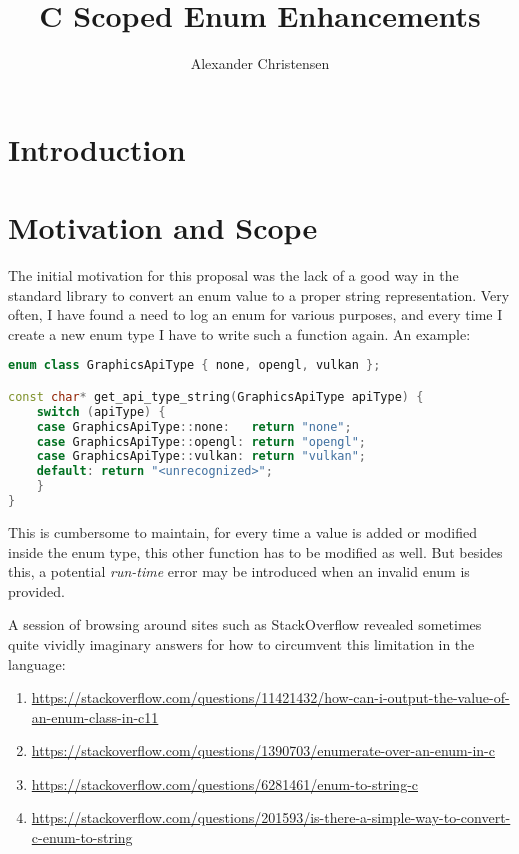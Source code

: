 \documentclass[
  format=manuscript,
  screen=true,
  review=false,
  nonacm=true,
  timestamp=true,
  balance=false]{acmart}
\author{Alexander Christensen}
\title{C Scoped Enum Enhancements}
\begin{document}

\maketitle
\tableofcontents

\section{Introduction}

\section{Motivation and Scope}

The initial motivation for this proposal was the lack of a good way in the standard
library to convert an enum value to a proper string representation. Very often, I
have found a need to log an enum for various purposes, and every time I create a new
enum type I have to write such a function again. An example:

\begin{lstlisting}[language=Cpp]
enum class GraphicsApiType { none, opengl, vulkan };

const char* get_api_type_string(GraphicsApiType apiType) {
    switch (apiType) {
    case GraphicsApiType::none:   return "none";
    case GraphicsApiType::opengl: return "opengl";
    case GraphicsApiType::vulkan: return "vulkan";
    default: return "<unrecognized>";
    }
}
\end{lstlisting}

\noindent
This is cumbersome to maintain, for every time a value is added or modified inside
the enum type, this other function has to be modified as well. But besides this,
a potential \textit{run-time} error may be introduced when an invalid enum is
provided.

A session of browsing around sites such as StackOverflow revealed sometimes quite
vividly imaginary answers for how to circumvent this limitation in the language:

\begin{enumerate}
\item \url{https://stackoverflow.com/questions/11421432/how-can-i-output-the-value-of-an-enum-class-in-c11}
\item \url{https://stackoverflow.com/questions/1390703/enumerate-over-an-enum-in-c}
\item \url{https://stackoverflow.com/questions/6281461/enum-to-string-c}
\item \url{https://stackoverflow.com/questions/201593/is-there-a-simple-way-to-convert-c-enum-to-string}
\end{enumerate}
\end{document}
